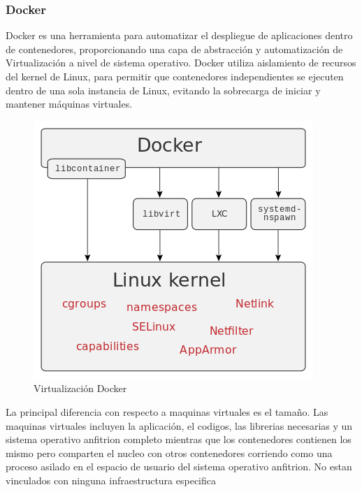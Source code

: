 \documentclass[a4paper,11pt]{book}
\begin{document}
\subsubsection{Docker}

Docker\cite{dk} es una herramienta para automatizar el despliegue de aplicaciones dentro de contenedores, proporcionando una capa de abstracción y automatización de Virtualización a nivel de sistema operativo. Docker utiliza aislamiento de recursos del kernel de Linux, para permitir que contenedores independientes se ejecuten dentro de una sola instancia de Linux, evitando la sobrecarga de iniciar y mantener máquinas virtuales.

\begin{figure}[H] 
\centering 
\includegraphics[scale=0.35]{imagenes/desarrollo_herramienta/docker.png}
\caption{ Virtualización Docker\cite{dkw}}
\end{figure}

La principal diferencia con respecto a maquinas virtuales es el tamaño. Las maquinas virtuales incluyen la aplicación, el codigos, las librerias necesarias y un sistema operativo anfitrion completo mientras que los contenedores contienen los mismo pero comparten el nucleo con otros contenedores corriendo como una proceso asilado en el espacio de usuario del sistema operativo anfitrion. No estan vinculados con ninguna infraestructura especifica 
\end{document}
